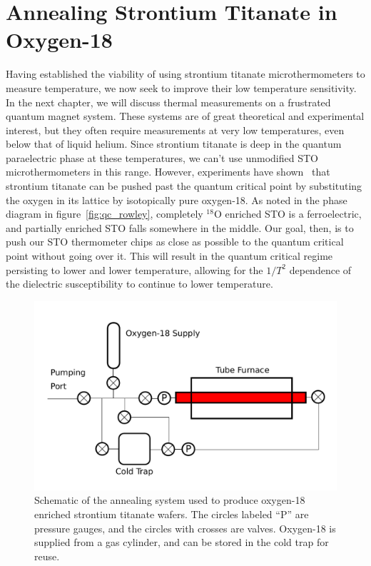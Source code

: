\documentclass{thesis-umich}
\begin{document}
\section{Annealing Strontium Titanate in Oxygen-18}

Having established the viability of using strontium titanate microthermometers to measure temperature, we now seek to improve their low temperature sensitivity. In the next chapter, we will discuss thermal measurements on a frustrated quantum magnet system. These systems are of great theoretical and experimental interest, but they often require measurements at very low temperatures, even below that of liquid helium. Since strontium titanate is deep in the quantum paraelectric phase at these temperatures, we can't use unmodified STO microthermometers in this range. However, experiments have shown~\cite{Rowley2014} that strontium titanate can be pushed past the quantum critical point by substituting the oxygen in its lattice by isotopically pure oxygen-18. As noted in the phase diagram in figure~\ref{fig:qc_rowley}, completely $^{18}$O enriched STO is a ferroelectric, and partially enriched STO falls somewhere in the middle. Our goal, then, is to push our STO thermometer chips as close as possible to the quantum critical point without going over it. This will result in the quantum critical regime persisting to lower and lower temperature, allowing for the $1/T^2$ dependence of the dielectric susceptibility to continue to lower temperature.  

\begin{figure} \caption[Strontium Titanate Annealing System]{Schematic of the annealing system used to produce oxygen-18 enriched strontium titanate wafers. The circles labeled ``P'' are pressure gauges, and the circles with crosses are valves. Oxygen-18 is supplied from a gas cylinder, and can be stored in the cold trap for reuse.}
	\label{fig:annealing_sys}
\includegraphics[width=\columnwidth]{figures/annealing_system.pdf}
\end{figure}
\end{document}
